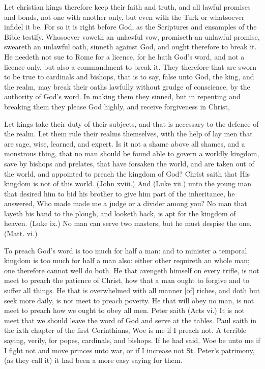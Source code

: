 Let christian kings therefore keep their faith and truth, 
and all lawful promises and bonds, not one with another 
only, but even with the Turk or whatsoever infidel it be. 
For so it is right before God, as the Scriptures and ensamples
of the Bible testify. Whosoever voweth an unlawful
vow, promiseth an unlawful promise, sweareth an 
unlawful oath, sinneth against God, and ought therefore 
to break it. He needeth not sue to Rome for a licence, 
for he hath God's word, and not a licence only, but also a 
commandment to break it. They therefore that are sworn 
to be true to cardinals and bishops, that is to say, false 
unto God, the king, and the realm, may break their oaths 
lawfully without grudge of conscience, by the authority of 
God's word. In making them they sinned, but in repenting
and breaking them they please God highly, and receive
forgiveness in Christ, 

Let kings take their duty of their subjects, and that is 
necessary to the defence of the realm. Let them rule 
their realms themselves, with the help of lay men that are 
sage, wise, learned, and expert. Is it not a shame above 
all shames, and a monstrous thing, that no man should be 
found able to govern a worldly kingdom, save by bishops and 
prelates, that have forsaken the world, and are taken out of
the world, and appointed to preach the kingdom of God?
Christ saith that His kingdom is not of this world. (John 
xviii.) And (Luke xii.) unto the young man that desired
him to bid his brother to give him part of the inheritance, 
he answered, Who made made me a judge or a divider 
among you? No man that layeth his hand to the plough, 
and looketh back, is apt for the kingdom of heaven. (Luke 
ix.) No man can serve two masters, but he must despise 
the one. (Matt. vi.) 

To preach God's word is too much for half a man: and 
to minister a temporal kingdom is too much for half a man 
also: either other requireth an whole man; one therefore 
cannot well do both. He that avengeth himself on every 
trifle, is not meet to preach the patience of Christ, how 
that a man ought to forgive and to suffer all things. He
that is overwhelmed with all manner [of] riches, and doth 
but seek more daily, is not meet to preach poverty. He 
that will obey no man, is not meet to preach how we ought 
to obey all men. Peter saith (Acts vi.) It is not meet 
that we should leave the word of God and serve at the tables.
Paul saith in the ixth chapter of the first Corinthians,
Woe is me if I preach not. A terrible saying, verily,
for popes, cardinals, and bishops. If he had said, Woe 
be unto me if I fight not and move princes unto war, or if 
I increase not St. Peter's patrimony, (as they call it) it had 
been a more easy saying for them. 

